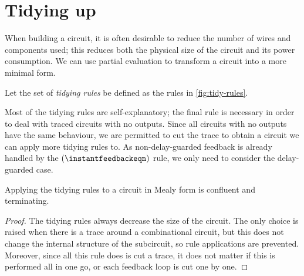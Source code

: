 \section{Tidying up}\label{sec:tidy}

When building a circuit, it is often desirable to reduce the number of wires
and components used; this reduces both the physical size of the circuit and its
power consumption.
We can use partial evaluation to transform a circuit into a more minimal form.

\begin{definition}
    Let the set of \emph{tidying rules} be defined as the rules in
    \cref{fig:tidy-rules}.
\end{definition}

Most of the tidying rules are self-explanatory; the final rule is necessary in
order to deal with traced circuits with no outputs.
Since all circuits with no outputs have the same behaviour, we are permitted to
cut the trace to obtain a circuit we can apply more tidying rules to.
As non-delay-guarded feedback is already handled by the
\((\instantfeedbackeqn)\) rule, we only need to consider the delay-guarded case.



\begin{proposition}
    Applying the tidying rules to a circuit in Mealy form is confluent and
    terminating.
\end{proposition}
\begin{proof}
    The tidying rules always decrease the size of the circuit.
    The only choice is raised when there is a trace around a combinational
    circuit, but this does not change the internal structure of the subcircuit,
    so rule applications are prevented.
    Moreover, since all this rule does is cut a trace, it does not matter if
    this is performed all in one go, or each feedback loop is cut one by one.
\end{proof}